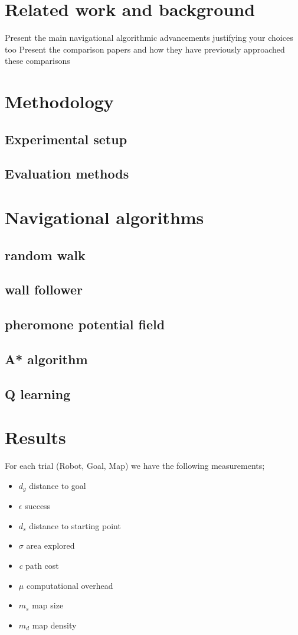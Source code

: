 \documentclass[letterpaper, 10 pt, conference]{ieeeconf}  %
\begin{document}
\section{Related work and background}

Present the main navigational algorithmic advancements justifying your choices too
Present the comparison papers and how they have previously approached these comparisons


\section{Methodology}
\subsection{Experimental setup}
\subsection{Evaluation methods}

\section{Navigational algorithms}

\subsection{random walk}
\subsection{wall follower}
\subsection{pheromone potential field}
\subsection{A* algorithm}
\subsection{Q learning}


\section{Results}

For each trial (Robot, Goal, Map) we have the following measurements;
\begin{itemize}
	\item \textit{$d_{g}$} distance to goal
	\item \textit{$\epsilon$} success 
	\item \textit{$d_{s}$} distance to starting point
	\item $\sigma$ area explored
	\item \textit{c} path cost
	\item $\mu$ computational overhead
	\item \textit{$m_{s}$} map size
	\item \textit{$m_{d}$} map density
\end{itemize}
\end{document}
